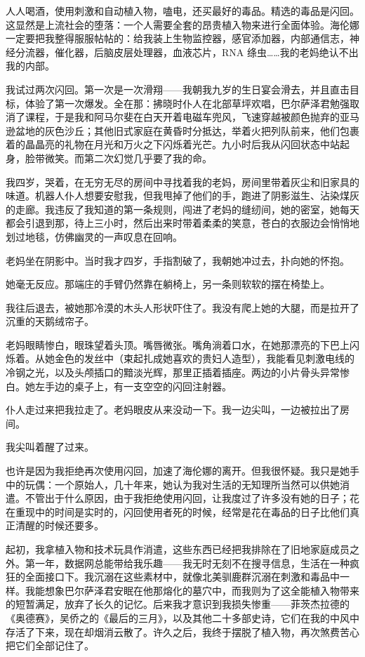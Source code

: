 \documentclass[AutoFakeBold=true]{book}
\begin{document}
人人喝酒，使用刺激和自动植入物，嗑电，还买最好的毒品。精选的毒品是闪回。这显然是上流社会的堕落：一个人需要全套的昂贵植入物来进行全面体验。海伦娜一定要把我整得服服帖帖的：给我装上生物监控器，感官添加器，内部通信志，神经分流器，催化器，后脑皮层处理器，血液芯片，RNA 绦虫……我的老妈绝认不出我的内部。

我试过两次闪回。第一次是一次滑翔——我朝我九岁的生日宴会滑去，并且直击目标，体验了第一次爆发。全在那：拂晓时仆人在北部草坪欢唱，巴尔萨泽君勉强取消了课程，于是我和阿马尔斐在白天开着电磁车兜风，飞速穿越被颜色抛弃的亚马逊盆地的灰色沙丘；其他旧式家庭在黄昏时分抵达，举着火把列队前来，他们包裹着的晶晶亮的礼物在月光和万火之下闪烁着光芒。九小时后我从闪回状态中站起身，脸带微笑。而第二次幻觉几乎要了我的命。

我四岁，哭着，在无穷无尽的房间中寻找着我的老妈，房间里带着灰尘和旧家具的味道。机器人仆人想要安慰我，但我甩掉了他们的手，跑进了阴影滋生、沾染煤灰的走廊。我违反了我知道的第一条规则，闯进了老妈的缝纫间，她的密室，她每天都会引退到那，待上三小时，然后出来时带着柔柔的笑意，苍白的衣服边会悄悄地划过地毯，仿佛幽灵的一声叹息在回响。

老妈坐在阴影中。当时我才四岁，手指割破了，我朝她冲过去，扑向她的怀抱。

她毫无反应。那端庄的手臂仍然靠在躺椅上，另一条则软软的摆在椅垫上。

我往后退去，被她那冷漠的木头人形状吓住了。我没有爬上她的大腿，而是拉开了沉重的天鹅绒帘子。

老妈眼睛惨白，眼珠望着头顶。嘴唇微张。嘴角淌着口水，在她那漂亮的下巴上闪烁着。从她金色的发丝中（束起扎成她喜欢的贵妇人造型），我能看见刺激电线的冷钢之光，以及头颅插口的黯淡光辉，那里正插着插座。两边的小片骨头异常惨白。她左手边的桌子上，有一支空空的闪回注射器。

仆人走过来把我拉走了。老妈眼皮从来没动一下。我一边尖叫，一边被拉出了房间。

我尖叫着醒了过来。

\vspace*{1em}

也许是因为我拒绝再次使用闪回，加速了海伦娜的离开。但我很怀疑。我只是她手中的玩偶：一个原始人，几十年来，她认为我对生活的无知理所当然可以供她消遣。不管出于什么原因，由于我拒绝使用闪回，让我度过了许多没有她的日子；花在重现中的时间是实时的，闪回使用者死的时候，经常是花在毒品的日子比他们真正清醒的时候还要多。

起初，我拿植入物和技术玩具作消遣，这些东西已经把我排除在了旧地家庭成员之外。第一年，数据网总能带给我乐趣——我无时无刻不在搜寻信息，生活在一种疯狂的全面接口下。我沉溺在这些素材中，就像北美驯鹿群沉溺在刺激和毒品中一样。我能想象巴尔萨泽君安眠在他那熔化的墓穴中，而我则为了这全能植入物带来的短暂满足，放弃了长久的记忆。后来我才意识到我损失惨重——菲茨杰拉德的《奥德赛》，吴侨之的《最后的三月》，以及其他二十多部史诗，它们在我的中风中存活了下来，现在却烟消云散了。许久之后，我终于摆脱了植入物，再次煞费苦心把它们全部记住了。
\end{document}
